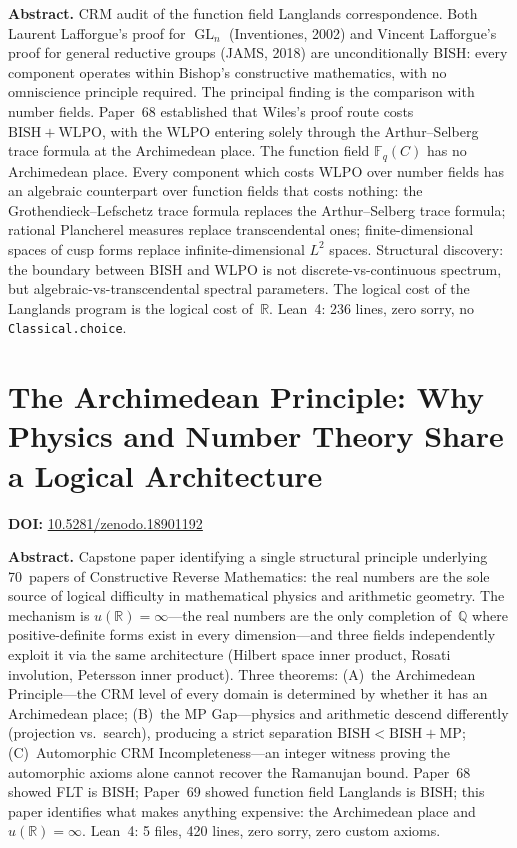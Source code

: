 \documentclass[11pt,a4paper]{article}
\DeclareMathOperator{\GL}{GL}
\begin{document}
\bigskip
\noindent\textbf{Abstract.}
CRM audit of the function field Langlands correspondence. Both Laurent Lafforgue's proof for $\GL_n$ (Inventiones, 2002) and Vincent Lafforgue's proof for general reductive groups (JAMS, 2018) are unconditionally BISH: every component operates within Bishop's constructive mathematics, with no omniscience principle required. The principal finding is the comparison with number fields. Paper~68 established that Wiles's proof route costs $\mathrm{BISH}+\mathrm{WLPO}$, with the WLPO entering solely through the Arthur--Selberg trace formula at the Archimedean place. The function field $\mathbb{F}_q(C)$ has no Archimedean place. Every component which costs WLPO over number fields has an algebraic counterpart over function fields that costs nothing: the Grothendieck--Lefschetz trace formula replaces the Arthur--Selberg trace formula; rational Plancherel measures replace transcendental ones; finite-dimensional spaces of cusp forms replace infinite-dimensional $L^2$ spaces. Structural discovery: the boundary between BISH and WLPO is not discrete-vs-continuous spectrum, but algebraic-vs-transcendental spectral parameters. The logical cost of the Langlands program is the logical cost of~$\mathbb{R}$. Lean~4: 236 lines, zero sorry, no \texttt{Classical.choice}.

\section{The Archimedean Principle: Why Physics and Number Theory Share a Logical Architecture}
\label{sec:p70}
\textbf{DOI:} \href{https://doi.org/10.5281/zenodo.18901192}{10.5281/zenodo.18901192}

\bigskip
\noindent\textbf{Abstract.}
Capstone paper identifying a single structural principle underlying 70~papers of Constructive Reverse Mathematics: the real numbers are the sole source of logical difficulty in mathematical physics and arithmetic geometry. The mechanism is $u(\mathbb{R})=\infty$---the real numbers are the only completion of~$\mathbb{Q}$ where positive-definite forms exist in every dimension---and three fields independently exploit it via the same architecture (Hilbert space inner product, Rosati involution, Petersson inner product). Three theorems: (A)~the Archimedean Principle---the CRM level of every domain is determined by whether it has an Archimedean place; (B)~the MP Gap---physics and arithmetic descend differently (projection vs.\ search), producing a strict separation $\mathrm{BISH}<\mathrm{BISH}+\mathrm{MP}$; (C)~Automorphic CRM Incompleteness---an integer witness proving the automorphic axioms alone cannot recover the Ramanujan bound. Paper~68 showed FLT is BISH; Paper~69 showed function field Langlands is BISH; this paper identifies what makes anything expensive: the Archimedean place and $u(\mathbb{R})=\infty$. Lean~4: 5 files, 420 lines, zero sorry, zero custom axioms.
\end{document}
